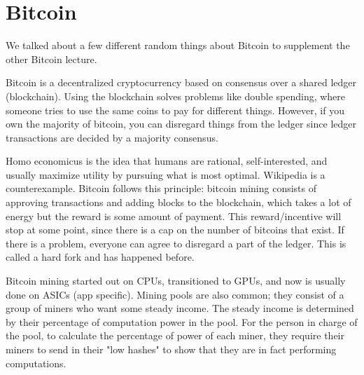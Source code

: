 \documentclass[twoside]{article}
\begin{document}
\section{Bitcoin}
We talked about a few different random things about Bitcoin to supplement the other Bitcoin lecture.

Bitcoin is a decentralized cryptocurrency based on consensus over a shared ledger (blockchain). Using the blockchain solves problems like double spending, where someone tries to use the same coins to pay for different things. However, if you own the majority of bitcoin, you can disregard things from the ledger since ledger transactions are decided by a majority consensus. 

Homo economicus is the idea that humans are rational, self-interested, and usually maximize utility by pursuing what is most optimal. Wikipedia is a counterexample. Bitcoin follows this principle: bitcoin mining consists of approving transactions and adding blocks to the blockchain, which takes a lot of energy but the reward is some amount of payment. This reward/incentive will stop at some point, since there is a cap on the number of bitcoins that exist. If there is a problem, everyone can agree to disregard a part of the ledger. This is called a hard fork and has happened before.

Bitcoin mining started out on CPUs, transitioned to GPUs, and now is usually done on ASICs (app specific). Mining pools are also common; they consist of a group of miners who want some steady income. The steady income is determined by their percentage of computation power in the pool. For the person in charge of the pool, to calculate the percentage of power of each miner, they require their miners to send in their "low hashes" to show that they are in fact performing computations.
\end{document}
